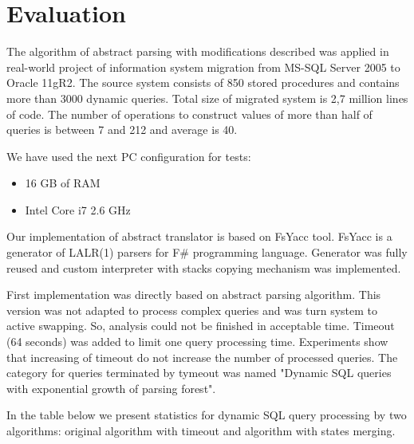 \section{Evaluation}
\label{sec:Evaluation}

The algorithm of abstract parsing with modifications described was applied in real-world project of 
information system migration from MS-SQL Server 2005 to Oracle 11gR2. The source system consists of 
850 stored procedures and contains more than 3000 dynamic queries. Total size of migrated system is 
2,7 million lines of code. The number of operations to construct values of more than half of queries 
is between 7 and 212 and average is 40.

We have used the next PC configuration for tests: 
\begin{itemize}
    \item 16 GB of RAM
    \item Intel Core i7 2.6 GHz
\end{itemize}

Our implementation of abstract translator is based on FsYacc tool. FsYacc is a generator of LALR(1)
parsers for F\# programming language. Generator was fully reused and custom interpreter with stacks 
copying mechanism was implemented. 

First implementation was directly based on abstract parsing algorithm. This version was not adapted 
to process complex queries and was turn system to active swapping. So, analysis could not be finished
in acceptable time. Timeout (64 seconds) was added to limit one query processing time. Experiments 
show that increasing of timeout do not increase the number of processed queries. The category for 
queries terminated by tymeout was named "Dynamic SQL queries with exponential growth of parsing 
forest".

In the table below we present statistics for dynamic SQL query processing by two algorithms: original
algorithm with timeout and algorithm with states merging.

